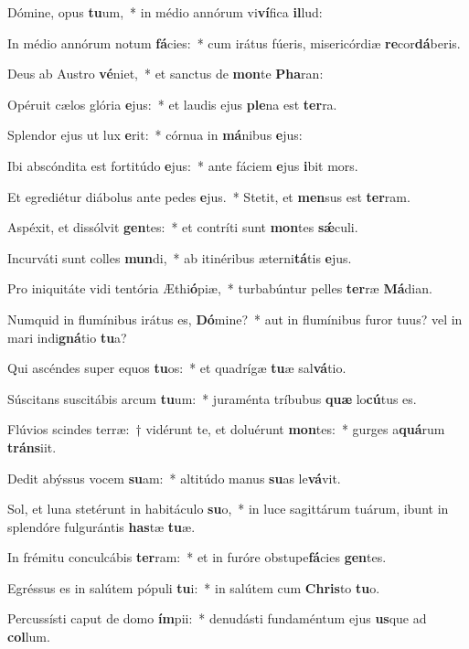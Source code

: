 \item Dómine, opus \textbf{tu}um,~* in médio annórum vi\textbf{ví}fica \textbf{il}lud:
\item In médio annórum notum \textbf{fá}cies:~* cum irátus fúeris, misericórdiæ \textbf{re}cor\textbf{dá}beris.
\item Deus ab Austro \textbf{vé}niet,~* et sanctus de \textbf{mon}te \textbf{Pha}ran:
\item Opéruit cælos glória \textbf{e}jus:~* et laudis ejus \textbf{ple}na est \textbf{ter}ra.
\item Splendor ejus ut lux \textbf{e}rit:~* córnua in \textbf{má}nibus \textbf{e}jus:
\item Ibi abscóndita est fortitúdo \textbf{e}jus:~* ante fáciem \textbf{e}jus \textbf{i}bit mors.
\item Et egrediétur diábolus ante pedes \textbf{e}jus.~* Stetit, et \textbf{men}sus est \textbf{ter}ram.
\item Aspéxit, et dissólvit \textbf{gen}tes:~* et contríti sunt \textbf{mon}tes \textbf{sǽ}culi.
\item Incurváti sunt colles \textbf{mun}di,~* ab itinéribus æterni\textbf{tá}tis \textbf{e}jus.
\item Pro iniquitáte vidi tentória Æthi\textbf{ó}piæ,~* turbabúntur pelles \textbf{ter}ræ \textbf{Má}dian.
\item Numquid in flumínibus irátus es, \textbf{Dó}mine?~* aut in flumínibus furor tuus? vel in mari indi\textbf{gná}tio \textbf{tu}a?
\item Qui ascéndes super equos \textbf{tu}os:~* et quadrígæ \textbf{tu}æ sal\textbf{vá}tio.
\item Súscitans suscitábis arcum \textbf{tu}um:~* juraménta tríbubus \textbf{quæ} lo\textbf{cú}tus es.
\item Flúvios scindes terræ:~† vidérunt te, et doluérunt \textbf{mon}tes:~* gurges a\textbf{quá}rum \textbf{tráns}iit.
\item Dedit abýssus vocem \textbf{su}am:~* altitúdo manus \textbf{su}as le\textbf{vá}vit.
\item Sol, et luna stetérunt in habitáculo \textbf{su}o,~* in luce sagittárum tuárum, ibunt in splendóre fulgurántis \textbf{has}tæ \textbf{tu}æ.
\item In frémitu conculcábis \textbf{ter}ram:~* et in furóre obstupe\textbf{fá}cies \textbf{gen}tes.
\item Egréssus es in salútem pópuli \textbf{tu}i:~* in salútem cum \textbf{Chris}to \textbf{tu}o.
\item Percussísti caput de domo \textbf{ím}pii:~* denudásti fundaméntum ejus \textbf{us}que ad \textbf{col}lum.
